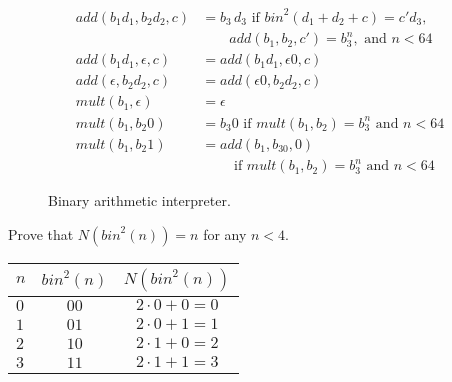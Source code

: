 \documentclass{tufte-handout}
\begin{document}
\begin{figure}[tbp]
\begin{align*}
   \\
  \mathit{add}(b_1 d_1 , b_2 d_2, c) &=  b_3\,d_3
  \text{ if } \mathit{bin}^2(d_1+ d_2+ c) = c' d_3,\\
  & \qquad  \mathit{add}(b_1, b_2, c') = b^n_3, \text{ and } n < 64 \\
\mathit{add}(b_1 d_1 , \epsilon, c) &= 
  \mathit{add}(b_1 d_1 , \epsilon 0, c) \\
\mathit{add}(\epsilon, b_2 d_2, c) &= 
\mathit{add}( \epsilon 0, b_2 d_2,c)
\\[2ex]
\mathit{mult}(b_1, \epsilon) &= \epsilon \\
\mathit{mult}(b_1, b_2 0) &= b_3 0
  \text{ if } \mathit{mult}(b_1,b_2) = b^n_3 \text{ and } n < 64 \\
 \mathit{mult}(b_1, b_2 1) &= 
   \mathit{add}(b_1, b_30, 0) \\
  & \qquad \text{ if } \mathit{mult}(b_1,b_2) = b^n_3 \text{ and } n < 64
\end{align*}
\caption{Binary arithmetic interpreter.}
\label{fig:interp-binary}
\end{figure}


\begin{Exercise}
\label{ex:bit-add}
Prove that 
$N (\mathit{bin}^2(n)) = n$ for any $n < 4$.
\end{Exercise}
\begin{Answer}
\begin{tabular}{l|c|c} 
  $n$ & $\mathit{bin}^2(n)$ & $N(\mathit{bin}^2(n))$ \\ \hline
  $0$ & $00$ & $2\cdot 0 + 0 = 0$ \\
  $1$ & $01$ & $2\cdot 0 + 1 = 1$\\
  $2$ & $10$ & $2\cdot 1 + 0 = 2$ \\
  $3$ & $11$ & $2\cdot 1 + 1 = 3$ 
\end{tabular} 
\end{Answer}
\end{document}
